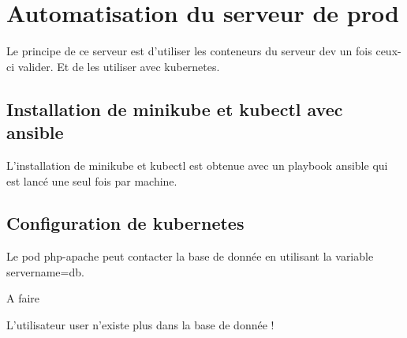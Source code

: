 \section{Automatisation du serveur de prod}
Le principe de ce serveur est d'utiliser les conteneurs du serveur dev un fois ceux-ci valider.
Et de les utiliser avec kubernetes.

\subsection{Installation de minikube et kubectl avec ansible}
L'installation de minikube et kubectl est obtenue avec  un playbook ansible qui est lancé une seul fois par machine.



\subsection{Configuration de kubernetes}
Le pod php-apache peut contacter la base de donnée en utilisant la variable servername=db.



{\LARGE A faire}

L'utilisateur user n'existe plus dans la base de donnée !